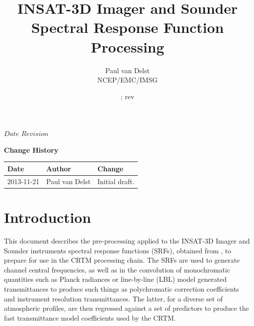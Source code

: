 



\SVN $Date$
\SVN $Revision$

\title{INSAT-3D Imager and Sounder Spectral Response Function Processing}
\author{Paul van Delst\\NCEP/EMC/IMSG}
\date{\SVNDate ; rev\SVNRevision}



\maketitle

\draftwatermark

\thispagestyle{empty}
\vspace*{10cm}
\begin{center}
  {\sffamily\Large\bfseries Change History}
  \begin{table}[htp]
    \centering
    \begin{tabular}{|p{2cm}|p{3cm}|p{8cm}|}
      \hline
      \sffamily\textbf{Date} & \sffamily\textbf{Author} & \sffamily\textbf{Change}\\
      \hline\hline
      2013-11-21 & Paul van Delst & Initial draft.\\
      \hline
    \end{tabular}
  \end{table}
\end{center}
\clearpage
\pagestyle{fancy}
\fancyhead[LE,RO]{\sffamily \rightmark}
\fancyhead[LO,RE]{\sffamily \leftmark}
\setcounter{page}{1}



\section{Introduction}
This document describes the pre-processing applied to the INSAT-3D Imager and Sounder instruments spectral response functions (SRFs), obtained from \cite{INSAT3D_SRF_Data}, to prepare for use in the CRTM processing chain. The SRFs are used to generate channel central frequencies, as well as in the convolution of monochromatic quantities such as Planck radiances or line-by-line (LBL) model generated transmittances to produce such things as polychromatic correction coefficients and instrument resolution transmittances. The latter, for a diverse set of atmospheric profiles, are then regressed against a set of predictors to produce the fast transmittance model coefficients used by the CRTM.



